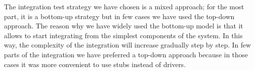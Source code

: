 The integration test strategy we have chosen is a mixed approach; for the most part, it is a bottom-up strategy but in few cases we have used the top-down approach. 
\newline 
The reason why we have widely used the bottom-up model is that it allows to start integrating from the simplest components of the system. In this way, the complexity of the integration will increase gradually step by step.
In few parts of the integration we have preferred a top-down approach because in those cases it was more convenient to use stubs instead of drivers.